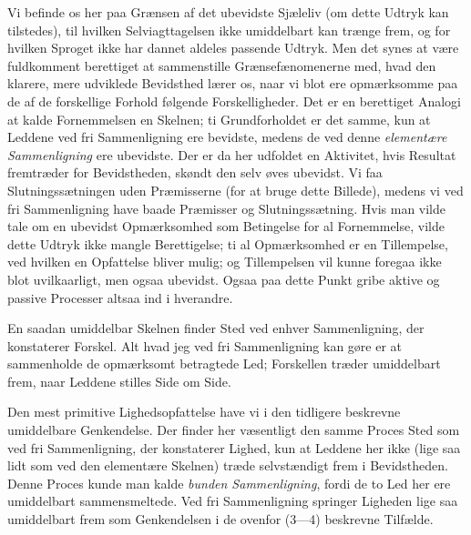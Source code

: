 \documentclass[12pt,a4paper,openany]{book}
\newcommand{\opage}[1]{\marginnote{\footnotesize\textit{[#1]}}}
\begin{document}
Vi befinde os her paa Grænsen af det ubevidste Sjæleliv (om dette Udtryk kan
tilstedes), til hvilken Selviagttagelsen ikke umiddelbart kan trænge frem, og
for hvilken Sproget ikke har dannet aldeles passende Udtryk. Men det synes at
være fuldkomment berettiget at sammenstille Grænsefænomenerne med, hvad den
klarere, mere udviklede Bevidsthed lærer os, naar vi blot ere opmærksomme paa
de af de forskellige Forhold følgende Forskelligheder. Det er en berettiget
Analogi at kalde Fornemmelsen en Skelnen; ti Grundforholdet er det samme, kun
at Leddene ved fri Sammenligning ere bevidste, medens de ved denne
\emph{elementære Sammenligning} ere ubevidste. Der er da her udfoldet en
Aktivitet, hvis Resultat fremtræder for Bevidstheden, skøndt den selv øves
ubevidst. Vi faa Slutningssætningen uden Præmisserne (for at bruge dette
Billede), medens vi ved fri Sammenligning have baade Præmisser og
Slutningssætning. Hvis man vilde tale om en ubevidst Opmærksomhed som
Betingelse for al Fornemmelse, vilde dette Udtryk ikke mangle Berettigelse; ti
al Opmærksomhed er en Tillempelse, ved hvilken en Opfattelse bliver mulig; og
Tillempelsen vil kunne foregaa ikke blot uvilkaarligt, men ogsaa ubevidst.
Ogsaa paa dette Punkt gribe aktive og passive Processer altsaa ind i hverandre.

En saadan umiddelbar Skelnen finder Sted ved enhver Sammenligning, der
konstaterer Forskel. Alt hvad jeg ved fri Sammenligning kan gøre er at
sammenholde de opmærksomt betragtede Led; Forskellen træder umiddelbart frem,
naar Leddene stilles Side om Side.

\setcounter{footnote}{0}%
\opage{64}Den mest primitive Lighedsopfattelse have vi i den tidligere
beskrevne umiddelbare Genkendelse. Der finder her væsentligt den samme Proces
Sted som ved fri Sammenligning, der konstaterer Lighed, kun at Leddene her ikke
(lige saa lidt som ved den elementære Skelnen) træde selvstændigt frem i
Bevidstheden. Denne Proces kunde man kalde \emph{bunden Sammenligning}, fordi
de to Led her ere umiddelbart sammensmeltede. Ved fri Sammenligning springer
Ligheden lige saa umiddelbart frem som Genkendelsen i de ovenfor (3---4)
beskrevne Tilfælde.
\end{document}
